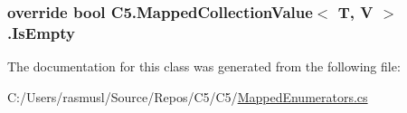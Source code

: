 \subsubsection[{Is\+Empty}]{\setlength{\rightskip}{0pt plus 5cm}override bool {\bf C5.\+Mapped\+Collection\+Value}$<$ T, V $>$.Is\+Empty\hspace{0.3cm}{\ttfamily [get]}}\label{class_c5_1_1_mapped_collection_value_a5e11b09b0a18ddbf579b2a31ef6d59d2}


The documentation for this class was generated from the following file\+:\begin{DoxyCompactItemize}
\item 
C\+:/\+Users/rasmusl/\+Source/\+Repos/\+C5/\+C5/\hyperlink{_mapped_enumerators_8cs}{Mapped\+Enumerators.\+cs}\end{DoxyCompactItemize}
